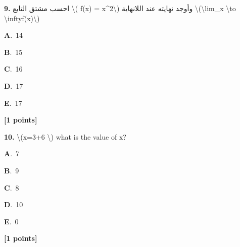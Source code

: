 \documentclass[12pt]{article}
\newcommand{\choice}[3]{%
  \noindent\textbf{#1}.~#2\hfill#3\par\vspace{0.25em}
}
\begin{document}
\noindent \textbf{\textenglish{9.}} {\textarabic{احسب مشتق التابع \textbackslash{}( f(x) = x\^{}2\textbackslash{}) وأوجد نهايته عند اللانهاية \textbackslash{}(\textbackslash{}lim\_{x \textbackslash{}to \textbackslash{}infty}f(x)\textbackslash{})}}

\noindent\choice{A}{{\textenglish{14}}}{}
\noindent\choice{B}{{\textenglish{15}}}{}
\noindent\choice{C}{{\textenglish{16}}}{}
\noindent\choice{D}{{\textenglish{17}}}{}
\noindent\choice{E}{{\textenglish{17}}}{}
\hfill \textbf{[1 points]}\vspace{0.5em}

\noindent \textbf{\textenglish{10.}} {\textenglish{\textbackslash{}(x=3+6 \textbackslash{}) what is the value of x?}}

\noindent\choice{A}{{\textenglish{7}}}{}
\noindent\choice{B}{{\textenglish{9}}}{}
\noindent\choice{C}{{\textenglish{8}}}{}
\noindent\choice{D}{{\textenglish{10}}}{}
\noindent\choice{E}{{\textenglish{0}}}{}
\hfill \textbf{[1 points]}\vspace{0.5em}
\end{document}
